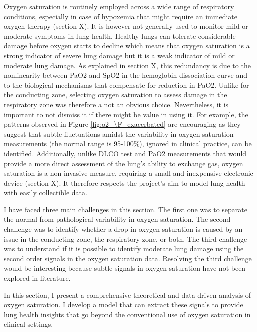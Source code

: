 Oxygen saturation is routinely employed across a wide range of respiratory conditions, especially in case of hypoxemia that might require an immediate oxygen therapy (section X). It is however not generally used to monitor mild or moderate symptoms in lung health. Healthy lungs can tolerate considerable damage before oxygen starts to decline which means that oxygen saturation is a strong indicator of severe lung damage but it is a weak indicator of mild or moderate lung damage. As explained in section X, this redundancy is due to the nonlinearity between PaO2 and SpO2 in the hemoglobin dissociation curve and to the biological mechanisms that compensate for reduction in PaO2. Unlike \F for the conducting zone, selecting oxygen saturation to assess damage in the respiratory zone was therefore a not an obvious choice. Nevertheless, it is important to not dismiss it if there might be value in using it.  For example, the patterns observed in Figure \ref{fig:o2_\F_exacerbated} are encouraging as they suggest that subtle fluctuations amidst the variability in oxygen saturation measurements (the normal range is 95-100\%), ignored in clinical practice, can be identified. Additionally, unlike DLCO test and PaO2 measurements that would provide a more direct assessment of the lung's ability to exchange gas, oxygen saturation is a non-invasive measure, requiring a small and inexpensive electronic device (section X). It therefore respects the project's aim to model lung health with easily collectible data.

I have faced three main challenges in this section. The first one was to separate the normal from pathological variability in oxygen saturation. The second challenge was to identify whether a drop in oxygen saturation is caused by an issue in the conducting zone, the respiratory zone, or both. The third challenge was to understand if it is possible to identify moderate lung damage using the second order signals in the oxygen saturation data. Resolving the third challenge would be interesting because subtle signals in oxygen saturation have not been explored in literature.

In this section, I present a comprehensive theoretical and data-driven analysis of oxygen saturation. I develop a model that can extract these signals to provide lung health insights  that go beyond the conventional use of oxygen saturation in clinical settings.

